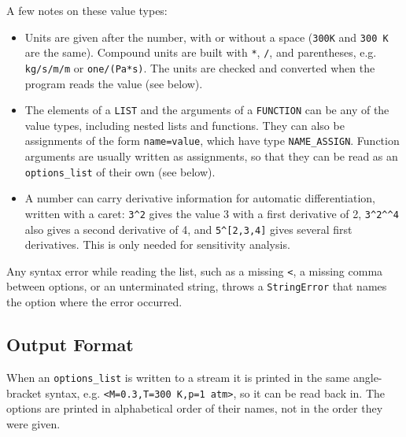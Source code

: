 %
A few notes on these value types:
\begin{itemize}
\item Units are given after the number, with or without a space
  (\verb|300K| and \verb|300 K| are the same).  Compound units are built
  with \verb|*|, \verb|/|, and parentheses, e.g. \verb|kg/s/m/m| or
  \verb|one/(Pa*s)|.  The units are checked and converted when the
  program reads the value (see below).
\item The elements of a {\tt LIST} and the arguments of a {\tt FUNCTION}
  can be any of the value types, including nested lists and functions.
  They can also be assignments of the form \verb|name=value|, which
  have type {\tt NAME\_ASSIGN}.  Function arguments are usually written
  as assignments, so that they can be read as an {\tt options\_list}
  of their own (see below).
\item A number can carry derivative information for automatic
  differentiation, written with a caret: \verb|3^2| gives the value 3
  with a first derivative of 2, \verb|3^2^^4| also gives a second
  derivative of 4, and \verb|5^[2,3,4]| gives several first
  derivatives.  This is only needed for sensitivity analysis.
\end{itemize}
%
Any syntax error while reading the list, such as a missing \verb|<|,
a missing comma between options, or an unterminated string, throws
a {\tt StringError} that names the option where the error occurred.
%
\subsection {Output Format}
%
When an {\tt options\_list} is written to a stream it is printed in the
same angle-bracket syntax, e.g. \verb|<M=0.3,T=300 K,p=1 atm>|, so it
can be read back in.  The options are printed in alphabetical order of
their names, not in the order they were given.
%
